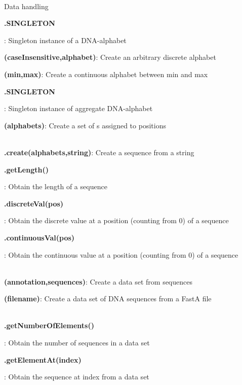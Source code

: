 \documentclass[10pt]{scrartcl}
\newcommand{\entry}[3]{{\item[]\bfseries #1#2}: #3}
\newcommand{\entrys}[3]{\item[\emph{static}] {\bfseries {#1#2}}: #3}
\newcommand{\entryn}[3]{\item[new] {\bfseries {#1#2}}: #3}
\newcommand{\sep}{\\~\vspace{-0.1cm}}
\begin{document}
\thispagestyle{empty}


\renewcommand{\section}[1]{{
~\vspace{-0.2cm}

\large\sfb #1\\}


}
\begin{flushleft}
\footnotesize
\section{Data handling}
\begin{itemize*}
\entry{\DNAAlphabet}{.SINGLETON}{Singleton instance of a DNA-alphabet}

\entryn{\DiscreteAlphabet}{(caseInsensitive,alphabet)}{Create an arbitrary discrete alphabet}

\entryn{\ContinuousAlphabet}{(min,max)}{Create a continuous alphabet between min and max}

\entry{\DNAAlphabetContainer}{.SINGLETON}{Singleton instance of aggregate DNA-alphabet}

\entryn{\AlphabetContainer}{(alphabets)}{Create a set of \Alphabet s assigned to positions}\sep

\entrys{\Sequence}{.create(alphabets,string)}{Create a sequence from a string}

\entry{\Sequence}{.getLength()}{Obtain the length of a sequence}

\entry{\Sequence}{.discreteVal(pos)}{Obtain the discrete value at a position (counting from 0) of a sequence}

\entry{\Sequence}{.continuousVal(pos)}{Obtain the continuous value at a position (counting from 0) of a sequence}\sep

\entryn{\DataSet}{(annotation,sequences)}{Create a data set from sequences}

\entryn{\DNADataSet}{(filename)}{Create a data set of DNA sequences from a FastA file}\sep

\entry{\DataSet}{.getNumberOfElements()}{Obtain the number of sequences in a data set}

\entry{\DataSet}{.getElementAt(index)}{Obtain the sequence at index from a data set}


\end{itemize*}
\end{flushleft}
\end{document}

